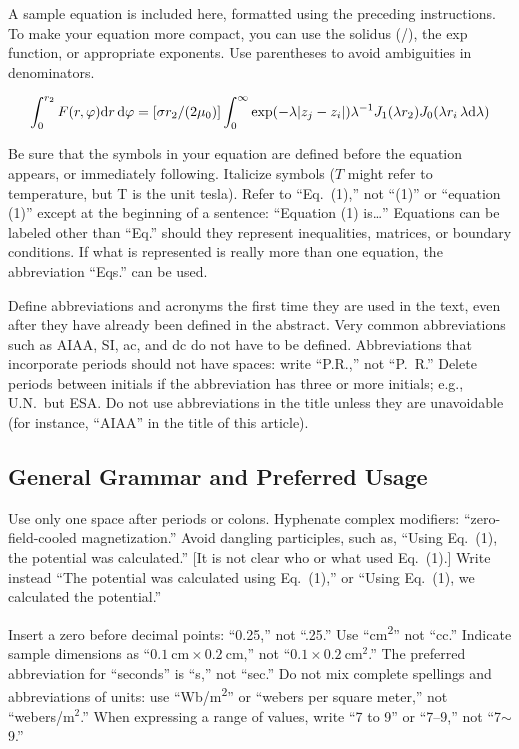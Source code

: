 \documentclass[conf]{new-aiaa}
\begin{document}
    A sample equation is included here, formatted using the preceding instructions. To make your equation more compact, you can use the solidus (/), the exp function, or appropriate exponents. Use parentheses to avoid ambiguities in denominators.
    
    \begin{equation}
    \label{sample:equation}
    \int^{r_2}_0 F(r,\varphi){\rm d}r\,{\rm d}\varphi = [\sigma r_2/(2\mu_0)]\int^{\infty}_0\exp(-\lambda|z_j-z_i|)\lambda^{-1}J_1 (\lambda r_2)J_0 (\lambda r_i\,\lambda {\rm d}\lambda)
    \end{equation}
    
    Be sure that the symbols in your equation are defined before the equation appears, or immediately following. Italicize symbols ($T$ might refer to temperature, but T is the unit tesla). Refer to ``Eq.~(1),'' not ``(1)'' or ``equation (1)'' except at the beginning of a sentence: ``Equation (1) is\ldots'' Equations can be labeled other than ``Eq.'' should they represent inequalities, matrices, or boundary conditions. If what is represented is really more than one equation, the abbreviation ``Eqs.'' can be used.
    
    Define abbreviations and acronyms the first time they are used in the text, even after they have already been defined in the abstract. Very common abbreviations such as AIAA, SI, ac, and dc do not have to be defined. Abbreviations that incorporate periods should not have spaces: write ``P.R.,'' not ``P.~R.'' Delete periods between initials if the abbreviation has three or more initials; e.g., U.N.~but ESA. Do not use abbreviations in the title unless they are unavoidable (for instance, ``AIAA'' in the title of this article).
    
    \subsection{General Grammar and Preferred Usage}
    Use only one space after periods or colons. Hyphenate complex modifiers: ``zero-field-cooled magnetization.'' Avoid dangling participles, such as, ``Using Eq.~(1), the potential was calculated.'' [It is not clear who or what used Eq.~(1).] Write instead ``The potential was calculated using Eq.~(1),'' or ``Using Eq.~(1), we calculated the potential.''
    
    Insert a zero before decimal points: ``0.25,'' not ``.25.'' Use ``\si{\centi\meter\squared}'' not ``cc.'' Indicate sample dimensions as ``$\SI{0.1}{\centi\meter} \times \SI{0.2}{\centi\meter}$,'' not ``$0.1 \times \SI{0.2}{\centi\meter\squared}$.'' The preferred abbreviation for ``seconds'' is ``s,'' not ``sec.'' Do not mix complete spellings and abbreviations of units: use ``\si[per-mode=symbol]{\weber\per\meter\squared}'' or ``webers per square meter,'' not ``webers/m$^2$.'' When expressing a range of values, write ``7 to 9'' or ``7--9,'' not ``7$\sim$9.''
    
\end{document}
